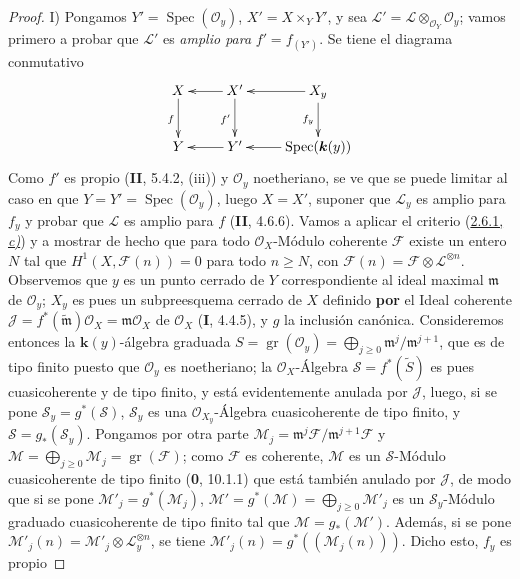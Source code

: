 \begin{proof}
\noindent I) Pongamos
$Y'=\operatorname{Spec}(\mathcal O_y)$, $X'=X\times_YY'$, y sea
$\mathcal L'=\mathcal L\otimes_{\mathcal O_Y}\mathcal O_y$;
vamos primero a probar que $\mathcal L'$ es \emph{amplio para}
$f'=f_{(Y')}$. Se tiene el diagrama conmutativo
\[
\xymatrix{
X\ar[d]_f & X'\ar[l]\ar[d]_{f'} & X_y\ar[l]\ar[d]_{f_y}\\
Y & Y'\ar[l] & \operatorname{Spec}(\boldsymbol{k}(y))\ar[l]
}
\]
Como $f'$ es propio (\textbf{II}, 5.4.2, (iii)) y $\mathcal O_y$ noetheriano, se
ve que se puede limitar al caso en que
$Y=Y'=\operatorname{Spec}(\mathcal O_y)$, luego $X=X'$, suponer que
$\mathcal L_y$ es amplio para $f_y$ y probar que $\mathcal L$ es amplio
para $f$ (\textbf{II}, 4.6.6). Vamos a aplicar el criterio
(\hyperref[III.2.6.1-fr]{2.6.1, \emph{c)}}) y a mostrar de hecho que para todo
$\mathcal O_X$-Módulo coherente $\mathcal F$ existe un entero $N$ tal que
$H^1(X,\mathcal F(n))=0$ para todo $n\geq N$, con
$\mathcal F(n)=\mathcal F\otimes\mathcal L^{\otimes n}$.
Observemos que $y$ es un punto cerrado de $Y$ correspondiente al ideal maximal
$\mathfrak m$ de $\mathcal O_y$; $X_y$ es pues un subpreesquema cerrado de
$X$ definido \textbf{por} el Ideal coherente
$\mathcal J=f^*(\widetilde{\mathfrak m})\mathcal O_X=
\mathfrak m\mathcal O_X$ de $\mathcal O_X$ (\textbf{I}, 4.4.5), y $g$ la inclusión
canónica. Consideremos entonces la $\boldsymbol{k}(y)$-álgebra graduada
$S=\operatorname{gr}(\mathcal O_y)
=\bigoplus_{j\geq0}\mathfrak m^j/\mathfrak m^{j+1}$,
que es de tipo finito puesto que $\mathcal O_y$ es noetheriano; la
$\mathcal O_X$-Álgebra $\mathcal S=f^*(\widetilde S)$ es pues
cuasicoherente y de tipo finito, y está evidentemente anulada por
$\mathcal J$, luego, si se pone $\mathcal S_y=g^*(\mathcal S)$,
$\mathcal S_y$ es una $\mathcal O_{X_y}$-Álgebra cuasicoherente de tipo
finito, y $\mathcal S=g_*(\mathcal S_y)$. Pongamos por otra parte
$\mathcal M_j=\mathfrak m^j\mathcal F/\mathfrak m^{j+1}\mathcal F$ y
$\mathcal M=\bigoplus_{j\geq0}\mathcal M_j
=\operatorname{gr}(\mathcal F)$;
como $\mathcal F$ es coherente, $\mathcal M$ es un $\mathcal S$-Módulo
cuasicoherente de tipo finito (\textbf{0}, 10.1.1) que está también anulado por
$\mathcal J$, de modo que si se pone
$\mathcal M'_j=g^*(\mathcal M_j)$, $\mathcal M'=g^*(\mathcal M)=\bigoplus_{j\geq0}\mathcal M'_j$
es un $\mathcal S_y$-Módulo graduado cuasicoherente de tipo
finito tal que $\mathcal M=g_*(\mathcal M')$. Además, si se pone
$\mathcal M'_j(n)=\mathcal M'_j\otimes\mathcal L_y^{\otimes n}$, se tiene
$\mathcal M'_j(n)=g^*((\mathcal M_j(n)))$. Dicho esto, $f_y$ es propio

\end{proof}
